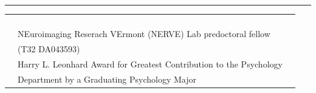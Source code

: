 \documentclass{my_cv}
\begin{document}
	\centering
	\\
		\vspace{0.2cm}
	

	\hrule
		\vspace{0.2cm}
	
	
	\vspace{0.5cm}

	\begin{longtable}[l]{g{0.2\textwidth}g{0.6\textwidth}r}
	 &\\
	
							&\\
	 &\\
	
							&\\
							
		 &
			 NEuroimaging Reserach VErmont (NERVE) Lab predoctoral fellow\\ 
			 & \hspace{2em} (T32 DA043593) \\

		& Harry L. Leonhard Award for Greatest Contribution to the Psychology \\ 
		& 	\hspace{2em} Department by a Graduating Psychology Major
	\end{longtable}
\end{document}

